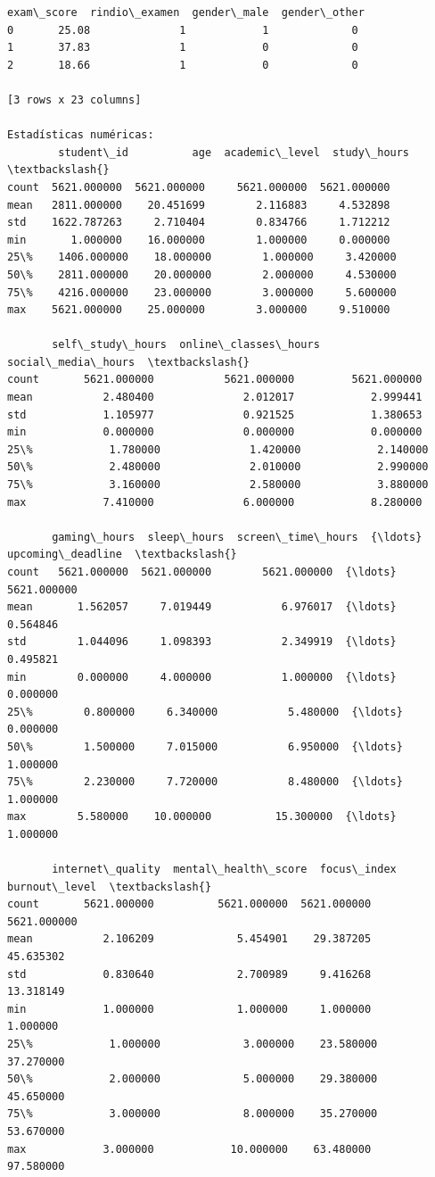 \documentclass[11pt]{article}
\begin{document}
\begin{Verbatim}[commandchars=\\\{\}]
   exam\_score  rindio\_examen  gender\_male  gender\_other
0       25.08              1            1             0
1       37.83              1            0             0
2       18.66              1            0             0

[3 rows x 23 columns]

Estadísticas numéricas:
        student\_id          age  academic\_level  study\_hours  \textbackslash{}
count  5621.000000  5621.000000     5621.000000  5621.000000
mean   2811.000000    20.451699        2.116883     4.532898
std    1622.787263     2.710404        0.834766     1.712212
min       1.000000    16.000000        1.000000     0.000000
25\%    1406.000000    18.000000        1.000000     3.420000
50\%    2811.000000    20.000000        2.000000     4.530000
75\%    4216.000000    23.000000        3.000000     5.600000
max    5621.000000    25.000000        3.000000     9.510000

       self\_study\_hours  online\_classes\_hours  social\_media\_hours  \textbackslash{}
count       5621.000000           5621.000000         5621.000000
mean           2.480400              2.012017            2.999441
std            1.105977              0.921525            1.380653
min            0.000000              0.000000            0.000000
25\%            1.780000              1.420000            2.140000
50\%            2.480000              2.010000            2.990000
75\%            3.160000              2.580000            3.880000
max            7.410000              6.000000            8.280000

       gaming\_hours  sleep\_hours  screen\_time\_hours  {\ldots}  upcoming\_deadline  \textbackslash{}
count   5621.000000  5621.000000        5621.000000  {\ldots}        5621.000000
mean       1.562057     7.019449           6.976017  {\ldots}           0.564846
std        1.044096     1.098393           2.349919  {\ldots}           0.495821
min        0.000000     4.000000           1.000000  {\ldots}           0.000000
25\%        0.800000     6.340000           5.480000  {\ldots}           0.000000
50\%        1.500000     7.015000           6.950000  {\ldots}           1.000000
75\%        2.230000     7.720000           8.480000  {\ldots}           1.000000
max        5.580000    10.000000          15.300000  {\ldots}           1.000000

       internet\_quality  mental\_health\_score  focus\_index  burnout\_level  \textbackslash{}
count       5621.000000          5621.000000  5621.000000    5621.000000
mean           2.106209             5.454901    29.387205      45.635302
std            0.830640             2.700989     9.416268      13.318149
min            1.000000             1.000000     1.000000       1.000000
25\%            1.000000             3.000000    23.580000      37.270000
50\%            2.000000             5.000000    29.380000      45.650000
75\%            3.000000             8.000000    35.270000      53.670000
max            3.000000            10.000000    63.480000      97.580000


\end{Verbatim}
\end{document}
